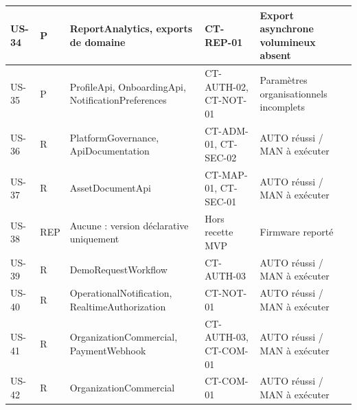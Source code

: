 \begin{longtable}{|C{1.15cm}|C{1.05cm}|L{5.6cm}|L{3.9cm}|L{3.1cm}|}
US-34 & P & ReportAnalytics, exports de domaine & CT-REP-01 & Export asynchrone volumineux absent \\ \hline
US-35 & P & ProfileApi, OnboardingApi, NotificationPreferences & CT-AUTH-02, CT-NOT-01 & Paramètres organisationnels incomplets \\ \hline
US-36 & R & PlatformGovernance, ApiDocumentation & CT-ADM-01, CT-SEC-02 & AUTO réussi / MAN à exécuter \\ \hline
US-37 & R & AssetDocumentApi & CT-MAP-01, CT-SEC-01 & AUTO réussi / MAN à exécuter \\ \hline
US-38 & REP & Aucune : version déclarative uniquement & Hors recette MVP & Firmware reporté \\ \hline
US-39 & R & DemoRequestWorkflow & CT-AUTH-03 & AUTO réussi / MAN à exécuter \\ \hline
US-40 & R & OperationalNotification, RealtimeAuthorization & CT-NOT-01 & AUTO réussi / MAN à exécuter \\ \hline
US-41 & R & OrganizationCommercial, PaymentWebhook & CT-AUTH-03, CT-COM-01 & AUTO réussi / MAN à exécuter \\ \hline
US-42 & R & OrganizationCommercial & CT-COM-01 & AUTO réussi / MAN à exécuter \\ \hline
\end{longtable}
\endgroup
\normalsize
